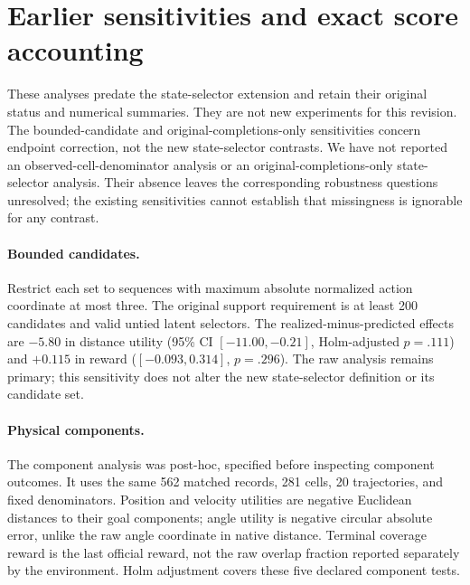\section{Earlier sensitivities and exact score accounting}
\label{app:sensitivity}

These analyses predate the state-selector extension and retain their original
status and numerical summaries. They are not new experiments for this revision.
The bounded-candidate and original-completions-only sensitivities concern
endpoint correction, not the new state-selector contrasts. We have not
reported an observed-cell-denominator analysis or an original-completions-only
state-selector analysis. Their absence leaves the corresponding robustness
questions unresolved; the existing sensitivities cannot establish that
missingness is ignorable for any contrast.

\paragraph{Bounded candidates.}
Restrict each set to sequences with maximum absolute normalized action
coordinate at most three. The original support requirement is at least 200
candidates and valid untied latent selectors. The realized-minus-predicted
effects are $-5.80$ in distance utility (95\% CI $[-11.00,-0.21]$,
Holm-adjusted $p=.111$) and $+0.115$ in reward ($[-0.093,0.314]$, $p=.296$).
The raw analysis remains primary; this sensitivity does not alter the new
state-selector definition or its candidate set.

\paragraph{Physical components.}
The component analysis was post-hoc, specified before inspecting component
outcomes. It uses the same 562 matched records, 281 cells, 20 trajectories,
and fixed denominators. Position and velocity utilities are negative
Euclidean distances to their goal components; angle utility is negative
circular absolute error, unlike the raw angle coordinate in native distance.
Terminal coverage reward is the last official reward, not the raw overlap
fraction reported separately by the environment. Holm adjustment covers these
five declared component tests.


